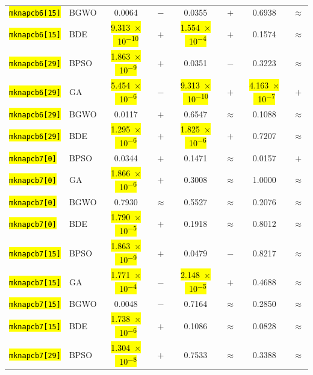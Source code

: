 \documentclass[mathematics,article,accept,moreauthors]{Definitions/mdpi}
\begin{document}
\begin{table}[H]
\begin{tabularx}{\textwidth}{Xlcccccc}
    \texttt{\hl{mknapcb6[15]}} & BGWO  &    0.0064 & $-$ &    0.0355 & $+$ &    0.6938 & $\approx$ \\
    \texttt{\hl{mknapcb6[15]}} & BDE   & \hl{9.313~$\times$~10\textsuperscript{$-$10}} & $+$ & \hl{1.554~$\times$~10\textsuperscript{$-$4}} & $+$ &    0.1574 & $\approx$ \\
    \midrule
    \texttt{\hl{mknapcb6[29]}} & BPSO  & \hl{1.863~$\times$~10\textsuperscript{$-$9}} & $+$ &    0.0351 & $-$ &    0.3223 & $\approx$ \\
    \texttt{\hl{mknapcb6[29]}} & GA    & \hl{5.454~$\times$~10\textsuperscript{$-$6}} & $-$ & \hl{9.313~$\times$~10\textsuperscript{$-$10}} & $+$ & \hl{4.163~$\times$~10\textsuperscript{$-$7}} & $+$ \\
    \texttt{\hl{mknapcb6[29]}} & BGWO  &    0.0117 & $+$ &    0.6547 & $\approx$ &    0.1088 & $\approx$ \\
    \texttt{\hl{mknapcb6[29]}} & BDE   & \hl{1.295~$\times$~10\textsuperscript{$-$6}} & $+$ & \hl{1.825~$\times$~10\textsuperscript{$-$6}} & $+$ &    0.7207 & $\approx$ \\
    \midrule
    \texttt{\hl{mknapcb7[0]}} & BPSO  &    0.0344 & $+$ &    0.1471 & $\approx$ &    0.0157 & $+$ \\
    \texttt{\hl{mknapcb7[0]}} & GA    & \hl{1.866~$\times$~10\textsuperscript{$-$6}} & $+$ &    0.3008 & $\approx$ &    1.0000 & $\approx$ \\
    \texttt{\hl{mknapcb7[0]}} & BGWO  &    0.7930 & $\approx$ &    0.5527 & $\approx$ &    0.2076 & $\approx$ \\
    \texttt{\hl{mknapcb7[0]}} & BDE   & \hl{1.790~$\times$~10\textsuperscript{$-$5}} & $+$ &    0.1918 & $\approx$ &    0.8012 & $\approx$ \\
    \midrule
    \texttt{\hl{mknapcb7[15]}} & BPSO  & \hl{1.863~$\times$~10\textsuperscript{$-$9}} & $+$ &    0.0479 & $-$ &    0.8217 & $\approx$ \\
    \texttt{\hl{mknapcb7[15]}} & GA    & \hl{1.771~$\times$~10\textsuperscript{$-$4}} & $-$ & \hl{2.148~$\times$~10\textsuperscript{$-$5}} & $+$ &    0.4688 & $\approx$ \\
    \texttt{\hl{mknapcb7[15]}} & BGWO  &    0.0048 & $-$ &    0.7164 & $\approx$ &    0.2850 & $\approx$ \\
    \texttt{\hl{mknapcb7[15]}} & BDE   & \hl{1.738~$\times$~10\textsuperscript{$-$6}} & $+$ &    0.1086 & $\approx$ &    0.0828 & $\approx$ \\
    \midrule
    \texttt{\hl{mknapcb7[29]}} & BPSO  & \hl{1.304~$\times$~10\textsuperscript{$-$8}} & $+$ &    0.7533 & $\approx$ &    0.3388 & $\approx$ \\

\end{tabularx}
\end{table}
\end{document}
